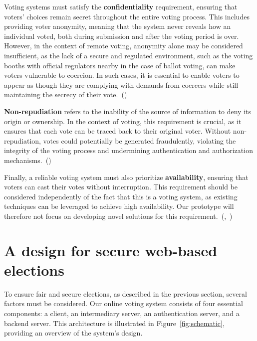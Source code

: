 \documentclass[a4paper,12pt,english]{article}
\begin{document}
Voting systems must satisfy the \textbf{confidentiality} requirement, ensuring that voters’ choices remain secret throughout the entire voting process. This includes providing voter anonymity, meaning that the system never reveals how an individual voted, both during submission and after the voting period is over. However, in the context of remote voting, anonymity alone may be considered insufficient, as the lack of a secure and regulated environment, such as the voting booths with official regulators nearby in the case of ballot voting, can make voters vulnerable to coercion. In such cases, it is essential to enable voters to appear as though they are complying with demands from coercers while still maintaining the secrecy of their vote.~(\cite{4531164})

\textbf{Non-repudiation} refers to the inability of the source of information to deny its origin or ownership. In the context of voting, this requirement is crucial, as it ensures that each vote can be traced back to their original voter. Without non-repudiation, votes could potentially be generated fraudulently, violating the integrity of the voting process and undermining authentication and authorization mechanisms.~(\cite{yousuf-2011})

Finally, a reliable voting system must also prioritize \textbf{availability}, ensuring that voters can cast their votes without interruption. This requirement should be considered independently of the fact that this is a voting system, as existing techniques can be leveraged to achieve high availability. Our prototype will therefore not focus on developing novel solutions for this requirement.~(\cite{challenger1998scalable},~\cite{baker2011megastore})

\section{A design for secure web-based elections}\label{sec:design}

To ensure fair and secure elections, as described in the previous section, several factors must be considered. Our online voting system consists of four essential components: a client, an intermediary server, an authentication server, and a backend server. This architecture is illustrated in Figure~\ref{fig:schematic}, providing an overview of the system's design.
\end{document}
